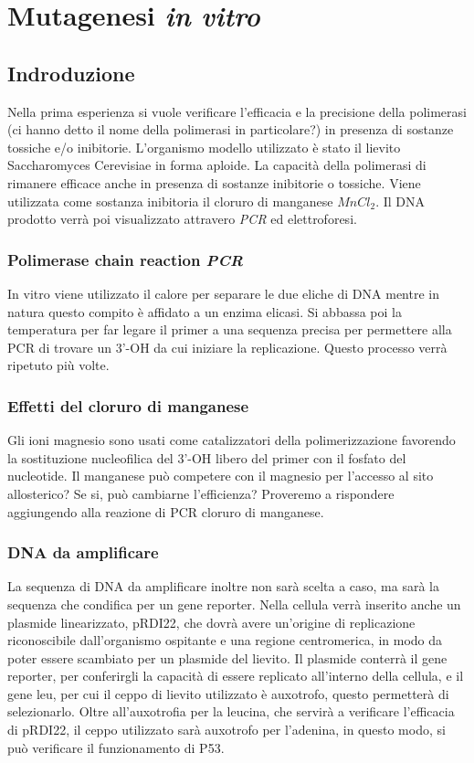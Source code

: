 \section*{Mutagenesi \emph{in vitro}}

	\subsection*{Indroduzione}

        Nella prima esperienza si vuole verificare l'efficacia e la precisione della polimerasi (ci hanno detto il nome della polimerasi in particolare?)
        in presenza di sostanze tossiche e/o inibitorie.
        L'organismo modello utilizzato è stato il lievito Saccharomyces Cerevisiae in forma aploide.
	La capacit\`a della polimerasi di rimanere efficace anche in presenza di sostanze inibitorie o tossiche.
	Viene utilizzata come sostanza inibitoria il cloruro di manganese \emph{$MnCl_2$}.
	Il DNA prodotto verr\`a poi visualizzato attravero \emph{PCR} ed elettroforesi.
        
		\subsubsection*{Polimerase chain reaction \emph{PCR}}
		In vitro viene utilizzato il calore per separare le due eliche di DNA mentre in natura questo compito è affidato a un enzima elicasi. 
       		 Si abbassa poi la temperatura per far legare il primer a una sequenza precisa per permettere alla PCR di trovare un 3'-OH da cui iniziare la replicazione.
        Questo processo verrà ripetuto più volte.


		\subsubsection*{Effetti del cloruro di manganese}
        	Gli ioni magnesio sono usati come catalizzatori della polimerizzazione favorendo la sostituzione nucleofilica del 3'-OH libero del primer con il fosfato del nucleotide.
        	Il manganese può competere con il magnesio per l'accesso al sito allosterico? Se si, può cambiarne l'efficienza?
        	Proveremo a rispondere aggiungendo alla reazione di PCR cloruro di manganese.

		\subsubsection*{DNA da amplificare}
        	La sequenza di DNA da amplificare inoltre non sarà scelta a caso, ma sarà la sequenza che condifica per un gene reporter.
		Nella cellula verrà inserito anche un plasmide linearizzato, pRDI22, che dovrà avere un'origine di replicazione riconoscibile dall'organismo ospitante e una regione centromerica, in modo da poter essere scambiato per un plasmide del lievito.
        	Il plasmide conterrà il gene reporter, per conferirgli la capacità di essere replicato all'interno della cellula, e il gene leu, per cui il ceppo di lievito utilizzato è auxotrofo, questo permetterà di selezionarlo.
        	Oltre all'auxotrofia per la leucina, che servirà a verificare l'efficacia di pRDI22, il ceppo utilizzato sarà auxotrofo per l'adenina, in questo modo, si può verificare il funzionamento di P53.

